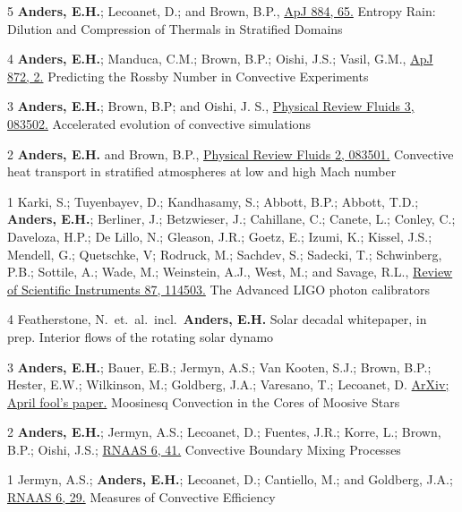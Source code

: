 	  {5}
	  {
		  \textbf{Anders, E.H.}; Lecoanet, D.; and Brown, B.P., 
		  \href{https://iopscience.iop.org/article/10.3847/1538-4357/ab3644}{ApJ 884, 65.}
	  }
	  {Entropy Rain: Dilution and Compression of Thermals in Stratified Domains}

\cvpub{}
	  {4}
	  {
		  \textbf{Anders, E.H.}; Manduca, C.M.; Brown, B.P.; Oishi, J.S.; Vasil, G.M., 
		  \href{https://iopscience.iop.org/article/10.3847/1538-4357/aaff61}{ApJ 872, 2.}
	  }
	  {Predicting the Rossby Number in Convective Experiments}

	  {3}
	  {
		  \textbf{Anders, E.H.}; Brown, B.P; and Oishi, J. S.,
		  \href{https://journals.aps.org/prfluids/abstract/10.1103/PhysRevFluids.3.083502}{Physical Review Fluids 3, 083502.}
	  }
	  {Accelerated evolution of convective simulations}

	  {2}
	  {
		  \textbf{Anders, E.H.} and Brown, B.P.,
		  \href{https://journals.aps.org/prfluids/abstract/10.1103/PhysRevFluids.2.083501}{Physical Review Fluids 2, 083501.}
	  }
	  {Convective heat transport in stratified atmospheres at low and high Mach number}

	  {1}
	  {
			Karki, S.; Tuyenbayev, D.; Kandhasamy, S.; Abbott, B.P.; Abbott, T.D.; \textbf{Anders, E.H.};
			Berliner, J.; Betzwieser, J.; Cahillane, C.; Canete, L.; Conley, C.; Daveloza, H.P.; De Lillo, N.;
			Gleason, J.R.; Goetz, E.; Izumi, K.; Kissel, J.S.; Mendell, G.; Quetschke, V; Rodruck, M.; Sachdev, S.;
			Sadecki, T.; Schwinberg, P.B.; Sottile, A.; Wade, M.; Weinstein, A.J., West, M.; and Savage, R.L.,
			\href{https://aip.scitation.org/doi/10.1063/1.4967303}{Review of Scientific Instruments 87, 114503.}
	  }
	  {The Advanced LIGO photon calibrators}

\vspace{0.3cm}
	  {4}
	  {
		Featherstone, N.~et.~al.~incl.~\textbf{Anders, E.H.}
        Solar decadal whitepaper, in prep. 
	  }
	  {Interior flows of the rotating solar dynamo}


\cvpub{}
	  {3}
	  {
		\textbf{Anders, E.H.}; Bauer, E.B.; Jermyn, A.S.; Van Kooten, S.J.; Brown, B.P.; Hester, E.W.; Wilkinson, M.; Goldberg, J.A.; Varesano, T.; Lecoanet, D.
        \href{https://arxiv.org/abs/2204.00002}{ArXiv; April fool's paper.}
	  }
	  {Moosinesq Convection in the Cores of Moosive Stars}

\cvpub{}
	  {2}
	  {
		\textbf{Anders, E.H.}; Jermyn, A.S.; Lecoanet, D.; Fuentes, J.R.; Korre, L.; Brown, B.P.; Oishi, J.S.; 
        \href{https://iopscience.iop.org/article/10.3847/2515-5172/ac5892}{RNAAS 6, 41.}
	  }
	  {Convective Boundary Mixing Processes}

\cvpub{}
	  {1}
	  {
		Jermyn, A.S.; \textbf{Anders, E.H.}; Lecoanet, D.; Cantiello, M.; and Goldberg, J.A.; 
        \href{https://iopscience.iop.org/article/10.3847/2515-5172/ac531e}{RNAAS 6, 29.}
	  }
	  {Measures of Convective Efficiency}


